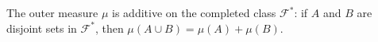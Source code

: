 The outer measure $\mu$ is additive on the completed class $\mathcal{F}^*$: if $A$ and $B$ are disjoint sets in $\mathcal{F}^*$, then $\mu(A \cup B) = \mu(A) + \mu(B)$.

